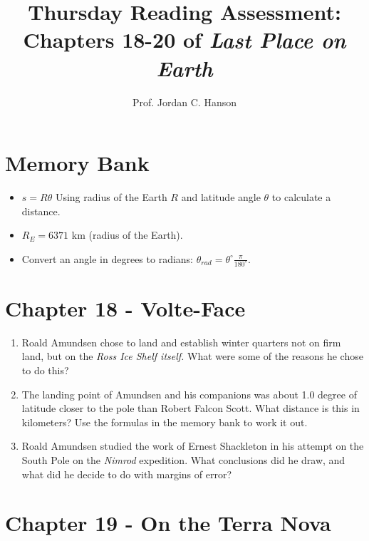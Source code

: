 \documentclass{article}
\begin{document}
\title{Thursday Reading Assessment: Chapters 18-20 of \textit{Last Place on Earth}}
\author{Prof. Jordan C. Hanson}

\maketitle

\section{Memory Bank}

\begin{itemize}
\item $s = R\theta$ Using radius of the Earth $R$ and latitude angle $\theta$ to calculate a distance.
\item $R_{E} = 6371$ km (radius of the Earth).
\item Convert an angle in degrees to radians: $\theta_{rad} = \theta^{\circ} \frac{\pi}{180^{\circ}}$.
\end{itemize}

\section{Chapter 18 - Volte-Face}

\begin{enumerate}
\item Roald Amundsen chose to land and establish winter quarters not on firm land, but on the \textit{Ross Ice Shelf itself.}  What were some of the reasons he chose to do this? \\ \vspace{1.5cm}
\item The landing point of Amundsen and his companions was about 1.0 degree of latitude closer to the pole than Robert Falcon Scott.  What distance is this in kilometers?  Use the formulas in the memory bank to work it out. \\ \vspace{1.5cm}
\item Roald Amundsen studied the work of Ernest Shackleton in his attempt on the South Pole on the \textit{Nimrod} expedition.  What conclusions did he draw, and what did he decide to do with margins of error? \\ \vspace{3cm}
\end{enumerate}

\section{Chapter 19 - On the Terra Nova}
\end{document}
